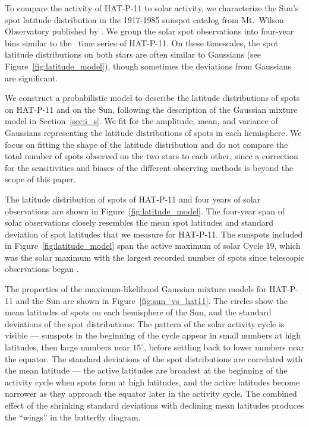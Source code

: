 To compare the activity of HAT-P-11 to solar activity, we characterize the Sun's spot latitude distribution in the 1917-1985 sunspot catalog from Mt.~Wilson Observatory published by \citet{Howard1984}. We group the solar spot observations into four-year bins similar to the \kepler\ time series of HAT-P-11. On these timescales, the spot latitude distributions on both stars are often similar to Gaussians (see Figure~\ref{fig:latitude_model}), though sometimes the deviations from Gaussians are significant.

We construct a probabilistic model to describe the latitude distributions of spots on HAT-P-11 and on the Sun, following the description of the Gaussian mixture model in Section~\ref{sec:i_s}. We fit for the amplitude, mean, and variance of Gaussians representing the latitude distributions of spots in each hemisphere. We focus on fitting the shape of the latitude distribution and do not compare the total number of spots observed on the two stars to each other, since a correction for the sensitivities and biases of the different observing methods is beyond the scope of this paper.

The latitude distribution of spots of HAT-P-11 and four years of solar observations are shown in Figure~\ref{fig:latitude_model}. The four-year span of solar observations closely resembles the mean spot latitudes and standard deviation of spot latitudes that we measure for HAT-P-11. The sunspots included in Figure~\ref{fig:latitude_model} span the active maximum of solar Cycle 19, which was the solar maximum with the largest recorded number of spots since telescopic observations began \citep{Solanki2013}.

The properties of the maximum-likelihood Gaussian mixture models for HAT-P-11 and the Sun are shown in Figure~\ref{fig:sun_vs_hat11}. The circles show the mean latitudes of spots on each hemisphere of the Sun, and the standard deviations of the spot distributions. The pattern of the solar activity cycle is visible --- sunspots in the beginning of the cycle appear in small numbers at high latitudes, then large numbers near $15^\circ$, before settling back to lower numbers near the equator. The standard deviations of the spot distributions are correlated with the mean latitude --- the active latitudes are broadest at the beginning of the activity cycle when spots form at high latitudes, and the active latitudes become narrower as they approach the equator later in the activity cycle. The combined effect of the shrinking standard deviations with declining mean latitudes produces the ``wings'' in the butterfly diagram.

